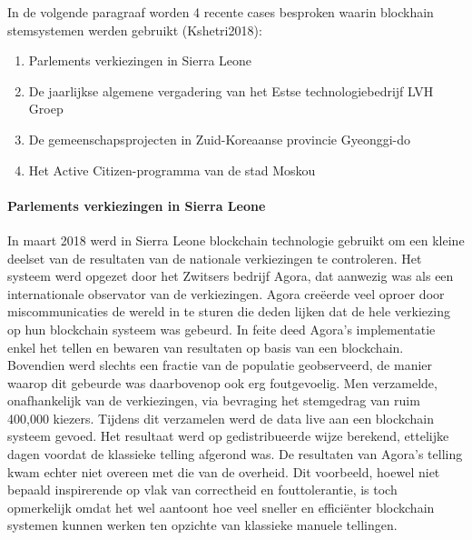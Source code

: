 			In de volgende paragraaf worden 4 recente cases besproken waarin blockhain stemsystemen werden gebruikt (Kshetri2018):
			\begin{enumerate}
				\item Parlements verkiezingen in Sierra Leone
				\item De jaarlijkse algemene vergadering van het Estse technologiebedrijf LVH Groep
				\item De gemeenschapsprojecten in Zuid-Koreaanse provincie Gyeonggi-do
				\item Het Active Citizen-programma van de stad Moskou
			\end{enumerate}
				
				\paragraph{Parlements verkiezingen in Sierra Leone}
				In maart 2018 werd in Sierra Leone blockchain technologie gebruikt om een kleine deelset van de resultaten van de nationale verkiezingen te controleren. Het systeem werd opgezet door het Zwitsers bedrijf Agora, dat aanwezig was als een internationale observator van de verkiezingen. Agora creëerde veel oproer door miscommunicaties de wereld in te sturen die  deden lijken dat de hele verkiezing op hun blockchain systeem was gebeurd. In feite deed Agora's implementatie enkel het tellen en bewaren van resultaten op basis van een blockchain. Bovendien werd slechts een fractie van de populatie geobserveerd, de manier waarop dit gebeurde was daarbovenop ook erg foutgevoelig. Men verzamelde, onafhankelijk van de verkiezingen, via bevraging het stemgedrag van ruim 400,000 kiezers. Tijdens dit verzamelen werd de data live aan een blockchain systeem gevoed. Het resultaat werd op gedistribueerde wijze berekend, ettelijke dagen voordat de klassieke telling afgerond was. De resultaten van Agora's telling kwam echter niet overeen met die van de overheid. Dit voorbeeld, hoewel niet bepaald  inspirerende op vlak van correctheid en fouttolerantie, is toch opmerkelijk omdat het wel aantoont hoe veel sneller en efficiënter blockchain systemen kunnen werken ten opzichte van klassieke manuele tellingen.
				
